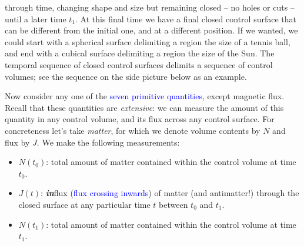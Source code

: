 \documentclass[a4paper,12pt,%
onecolumn,oneside,titlepage,%
british%
]{memoir}
\providecommand{\href}[2]{#2}
\renewcommand*{\|}[1][]{\nonscript\:#1\vert\nonscript\:\mathopen{}}
\newcommand*{\sect}{\S}%
\newcommand*{\furl}[2]{\href{#1}{#2}\pagenote{\url{#1}}}
\renewcommand*{\autoref}[2]{\sidepar{\vspace{-1ex}\footnotesize{\color{blue}\faIcon{%
reply%
}\enspace\sect\,\ref{#1} page\,\pageref{#1}}}\textcolor{blue}{#2}}
\newcommand*{\yN}{N}
\newcommand*{\yJ}{J}
\newcommand*{\yti}{t_{0}}
\newcommand*{\ytf}{t_{1}}
\begin{document}
through time, changing shape and size but remaining closed -- no holes or cuts -- until a later time $\ytf$. At this final time we have a final closed control surface that can be different from the initial one, and at a different position. If we wanted, we could start with a spherical surface delimiting a region the size of a tennis ball, and end with a cubical surface delimiting a region the size of the Sun. The temporal sequence of closed control surfaces delimits a sequence of control volumes; see the sequence on the side picture below as an example.


Now consider any one of the \autoref{sec:stuff}{seven primitive quantities}, except magnetic flux. Recall that these quantities are \emph{extensive}: we can measure the amount of this quantity in any control volume, and its flux across any control surface. For concreteness let's take \emph{matter}, for which we denote volume contents by $\yN$ and flux by $\yJ$. We make the following measurements:
\begin{itemize}
\item $N(\yti)$: total amount of matter contained within the control volume at time $\yti$.

\item $\yJ(t)$: \emph{\textbf{in}}flux (\autoref{sec:in_out_flux}{flux crossing inwards}) of matter (and antimatter!) through the closed surface at any particular time $t$ between $\yti$ and $\ytf$.

\item $\yN(\ytf)$: total amount of matter contained within the control volume at time $\ytf$.
\end{itemize}
\end{document}

